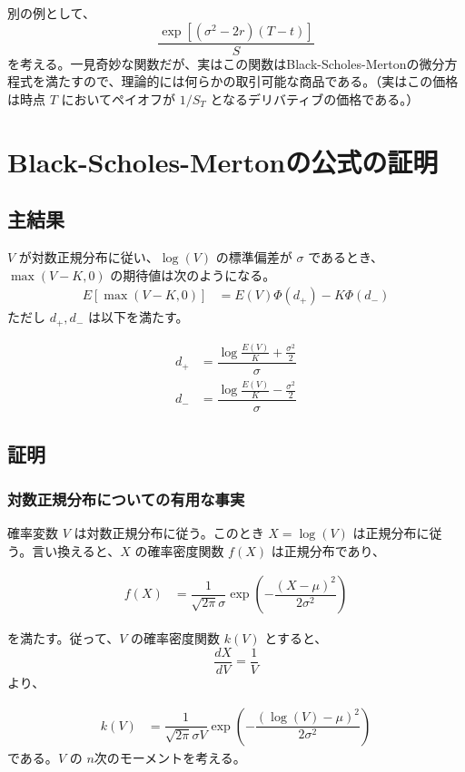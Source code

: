\documentclass[uplatex]{jsarticle}
\begin{document}
別の例として、
$$
	\dfrac{\exp{[(\sigma^{2} - 2r)(T-t)]}}{S}
$$
を考える。一見奇妙な関数だが、実はこの関数はBlack-Scholes-Mertonの微分方程式を満たすので、理論的には何らかの取引可能な商品である。（実はこの価格は時点 $T$ においてペイオフが $1/S_{T}$ となるデリバティブの価格である。）

\section{Black-Scholes-Mertonの公式の証明}

\subsection{主結果}

$V$ が対数正規分布に従い、$\log(V)$ の標準偏差が $\sigma$ であるとき、$\max(V-K,0)$ の期待値は次のようになる。
\begin{align}
	E \left[ \max(V-K,0) \right] & = E(V) \Phi (d_{+}) - K \Phi (d_{-})
\end{align}
ただし $d_{+},d_{-}$ は以下を満たす。

\begin{align}
	d_{+} & = \dfrac{ \log \frac{E(V)}{K} + \frac{\sigma^{2}}{2} }{ \sigma } \\
	d_{-} & = \dfrac{ \log \frac{E(V)}{K} - \frac{\sigma^{2}}{2} }{ \sigma }
\end{align}


\subsection{証明}

\subsubsection{対数正規分布についての有用な事実}

確率変数 $V$ は対数正規分布に従う。このとき $X = \log(V)$ は正規分布に従う。言い換えると、$X$ の確率密度関数 $f(X)$ は正規分布であり、

\begin{align}
	f(X) & = \dfrac{1}{\sqrt{2 \pi} \sigma } \exp \left( - \dfrac{(X - \mu )^{2}}{2 \sigma^{2}} \right)
\end{align}

を満たす。従って、$V$ の確率密度関数 $k(V)$ とすると、
$$
	\dfrac{dX}{dV} = \dfrac{1}{V}
$$
より、

\begin{align}
	k(V) & = \dfrac{1}{\sqrt{2 \pi} \sigma V} \exp \left( - \dfrac{(\log{(V)}- \mu )^{2}}{2 \sigma^{2}} \right)
\end{align}
である。$V$ の $n$次のモーメントを考える。
\end{document}
